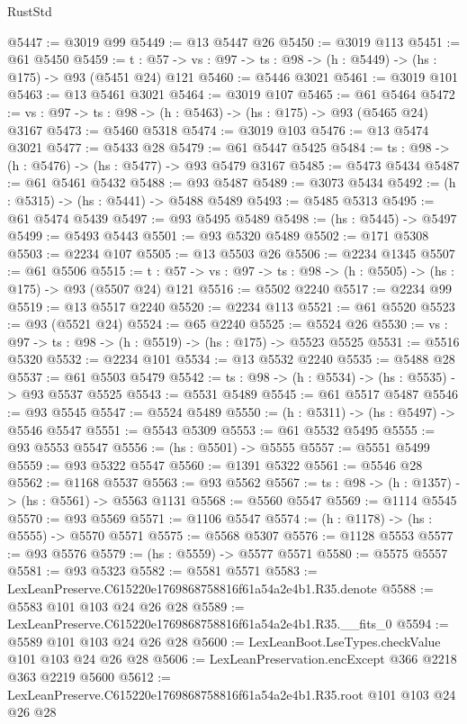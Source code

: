 \begin{lexlean}{RustStd}
\begin{coremodule}
@5447 := @3019 @99
@5449 := @13 @5447 @26
@5450 := @3019 @113
@5451 := @61 @5450
@5459 := {t : @57} -> {vs : @97} -> {ts : @98} -> (h : @5449) -> (hs : @175) -> @93 (@5451 @24) @121
@5460 := @5446 @3021
@5461 := @3019 @101
@5463 := @13 @5461 @3021
@5464 := @3019 @107
@5465 := @61 @5464
@5472 := {vs : @97} -> {ts : @98} -> (h : @5463) -> (hs : @175) -> @93 (@5465 @24) @3167
@5473 := @5460 @5318
@5474 := @3019 @103
@5476 := @13 @5474 @3021
@5477 := @5433 @28
@5479 := @61 @5447 @5425
@5484 := {ts : @98} -> (h : @5476) -> (hs : @5477) -> @93 @5479 @3167
@5485 := @5473 @5434
@5487 := @61 @5461 @5432
@5488 := @93 @5487
@5489 := @3073 @5434
@5492 := (h : @5315) -> (hs : @5441) -> @5488 @5489
@5493 := @5485 @5313
@5495 := @61 @5474 @5439
@5497 := @93 @5495 @5489
@5498 := (hs : @5445) -> @5497
@5499 := @5493 @5443
@5501 := @93 @5320 @5489
@5502 := @171 @5308
@5503 := @2234 @107
@5505 := @13 @5503 @26
@5506 := @2234 @1345
@5507 := @61 @5506
@5515 := {t : @57} -> {vs : @97} -> {ts : @98} -> (h : @5505) -> (hs : @175) -> @93 (@5507 @24) @121
@5516 := @5502 @2240
@5517 := @2234 @99
@5519 := @13 @5517 @2240
@5520 := @2234 @113
@5521 := @61 @5520
@5523 := @93 (@5521 @24)
@5524 := @65 @2240
@5525 := @5524 @26
@5530 := {vs : @97} -> {ts : @98} -> (h : @5519) -> (hs : @175) -> @5523 @5525
@5531 := @5516 @5320
@5532 := @2234 @101
@5534 := @13 @5532 @2240
@5535 := @5488 @28
@5537 := @61 @5503 @5479
@5542 := {ts : @98} -> (h : @5534) -> (hs : @5535) -> @93 @5537 @5525
@5543 := @5531 @5489
@5545 := @61 @5517 @5487
@5546 := @93 @5545
@5547 := @5524 @5489
@5550 := (h : @5311) -> (hs : @5497) -> @5546 @5547
@5551 := @5543 @5309
@5553 := @61 @5532 @5495
@5555 := @93 @5553 @5547
@5556 := (hs : @5501) -> @5555
@5557 := @5551 @5499
@5559 := @93 @5322 @5547
@5560 := @1391 @5322
@5561 := @5546 @28
@5562 := @1168 @5537
@5563 := @93 @5562
@5567 := {ts : @98} -> (h : @1357) -> (hs : @5561) -> @5563 @1131
@5568 := @5560 @5547
@5569 := @1114 @5545
@5570 := @93 @5569
@5571 := @1106 @5547
@5574 := (h : @1178) -> (hs : @5555) -> @5570 @5571
@5575 := @5568 @5307
@5576 := @1128 @5553
@5577 := @93 @5576
@5579 := (hs : @5559) -> @5577 @5571
@5580 := @5575 @5557
@5581 := @93 @5323
@5582 := @5581 @5571
@5583 := LexLeanPreserve.C615220e1769868758816f61a54a2e4b1.R35.denote
@5588 := @5583 @101 @103 @24 @26 @28
@5589 := LexLeanPreserve.C615220e1769868758816f61a54a2e4b1.R35.__fits_0
@5594 := @5589 @101 @103 @24 @26 @28
@5600 := LexLeanBoot.LseTypes.checkValue @101 @103 @24 @26 @28
@5606 := LexLeanPreservation.encExcept @366 @2218 @363 @2219 @5600
@5612 := LexLeanPreserve.C615220e1769868758816f61a54a2e4b1.R35.root @101 @103 @24 @26 @28

\end{coremodule}
\end{lexlean}
